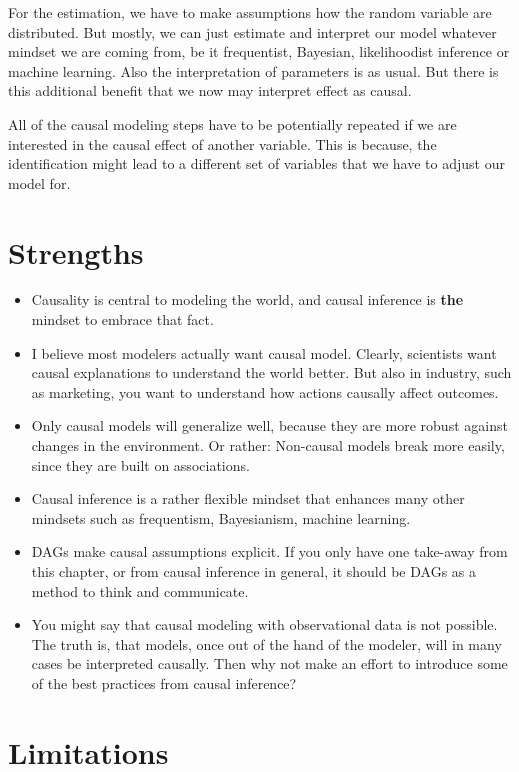 \documentclass[
  10pt,
]{scrbook}
\providecommand{\tightlist}{%
  \setlength{\itemsep}{0pt}\setlength{\parskip}{0pt}}
\begin{document}
For the estimation, we have to make assumptions how the random variable are distributed.
But mostly, we can just estimate and interpret our model whatever mindset we are coming from, be it frequentist, Bayesian, likelihoodist inference or machine learning.
Also the interpretation of parameters is as usual.
But there is this additional benefit that we now may interpret effect as causal.

All of the causal modeling steps have to be potentially repeated if we are interested in the causal effect of another variable.
This is because, the identification might lead to a different set of variables that we have to adjust our model for.

\hypertarget{strengths-4}{%
\section{Strengths}\label{strengths-4}}

\begin{itemize}
\tightlist
\item
  Causality is central to modeling the world, and causal inference is \textbf{the} mindset to embrace that fact.
\item
  I believe most modelers actually want causal model. Clearly, scientists want causal explanations to understand the world better. But also in industry, such as marketing, you want to understand how actions causally affect outcomes.
\item
  Only causal models will generalize well, because they are more robust against changes in the environment. Or rather: Non-causal models break more easily, since they are built on associations.
\item
  Causal inference is a rather flexible mindset that enhances many other mindsets such as frequentism, Bayesianism, machine learning.
\item
  DAGs make causal assumptions explicit. If you only have one take-away from this chapter, or from causal inference in general, it should be DAGs as a method to think and communicate.
\item
  You might say that causal modeling with observational data is not possible. The truth is, that models, once out of the hand of the modeler, will in many cases be interpreted causally. Then why not make an effort to introduce some of the best practices from causal inference?
\end{itemize}

\hypertarget{limitations-4}{%
\section{Limitations}\label{limitations-4}}
\end{document}
